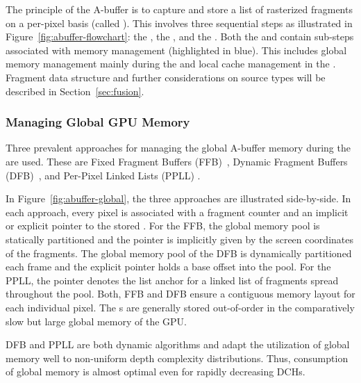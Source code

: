 \documentclass{egpubl}
\newcommand{\ab}{\mbox{A-buffer}}
\newcommand{\dch}{DCH}
\begin{document}
The principle of the \ab{} is to capture and store a list of rasterized fragments on a per-pixel basis (called \emph{\bFraglist}). 
This involves three sequential steps as illustrated in Figure~\ref{fig:abuffer-flowchart}: the \sClear, the \sFill, and the \sResolve. 
Both the \sFill{} and \sResolve{} contain sub-steps associated with memory management (highlighted in blue). 
This includes global memory management mainly during the \sFill{} and local cache management in the \sResolve.
Fragment data structure and further considerations on source types will be described in Section~\ref{sec:fusion}.





\subsubsection*{Managing Global GPU Memory}

Three prevalent approaches for managing the global \ab{} memory during the \sFill{} are used.
These are Fixed Fragment Buffers (FFB)~\cite{Crassin2010}, Dynamic Fragment Buffers (DFB)~\cite{Maule2012,Vasilakis2012}, and Per-Pixel Linked Lists (PPLL) \cite{kainz2009ray,Yang2010,Crassin2010}. 

In Figure~\ref{fig:abuffer-global}, the three approaches are illustrated side-by-side.  
In each approach, every pixel is associated with a fragment counter and an implicit or explicit pointer to the stored \bFraglist. 
For the FFB, the global memory pool is statically partitioned and the pointer is implicitly given by the screen coordinates of the fragments. 
The global memory pool of the DFB is dynamically partitioned each frame and the explicit pointer holds a base offset into the pool. 
For the PPLL, the pointer denotes the list anchor for a linked list of fragments spread throughout the pool. 
Both, FFB and DFB ensure a contiguous memory layout for each individual pixel. 
The \bFraglist s are generally stored out-of-order in the comparatively slow but large global memory of the GPU.

DFB and PPLL are both dynamic algorithms and adapt the utilization of global memory well to non-uniform depth complexity distributions. 
Thus, consumption of global memory is almost optimal even for rapidly decreasing \dch{}s. 
\end{document}
